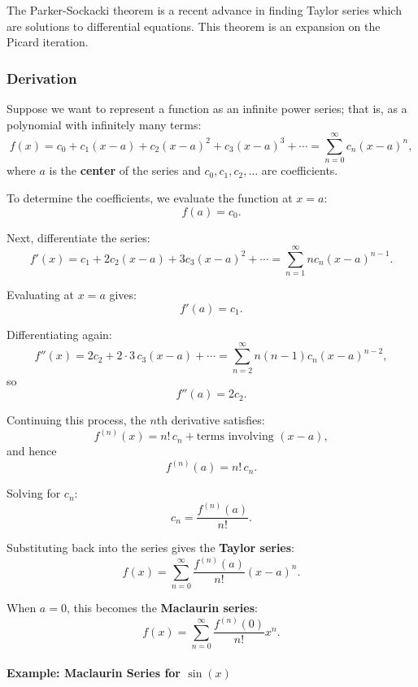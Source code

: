 The Parker-Sockacki theorem is a recent advance in finding Taylor series which are solutions to differential equations. This theorem is an expansion on the Picard iteration.


\subsubsection{Derivation}
\label{sss:deri-b600}

Suppose we want to represent a function as an infinite power series; that is, 
as a polynomial with infinitely many terms:
\[
f(x) = c_0 + c_1(x-a) + c_2(x-a)^2 + c_3(x-a)^3 + \cdots
= \sum_{n=0}^{\infty} c_n (x-a)^n,
\]
where $a$ is the \textbf{center} of the series and $c_0, c_1, c_2, \dots$ are coefficients.

\medskip

To determine the coefficients, we evaluate the function at $x=a$:
\[
f(a) = c_0.
\]

Next, differentiate the series:
\[
f'(x) = c_1 + 2c_2(x-a) + 3c_3(x-a)^2 + \cdots
= \sum_{n=1}^{\infty} n c_n (x-a)^{n-1}.
\]

Evaluating at $x=a$ gives:
\[
f'(a) = c_1.
\]

Differentiating again:
\[
f''(x) = 2c_2 + 2\cdot 3\, c_3 (x-a) + \cdots
= \sum_{n=2}^{\infty} n(n-1)c_n (x-a)^{n-2},
\]
so
\[
f''(a) = 2c_2.
\]

Continuing this process, the $n$th derivative satisfies:
\[
f^{(n)}(x) = n! \, c_n + \text{terms involving } (x-a),
\]
and hence
\[
f^{(n)}(a) = n! \, c_n.
\]

Solving for $c_n$:
\[
c_n = \frac{f^{(n)}(a)}{n!}.
\]

\medskip

Substituting back into the series gives the \textbf{Taylor series}:
\[
f(x) = \sum_{n=0}^{\infty} \frac{f^{(n)}(a)}{n!}(x-a)^n.
\]

When $a=0$, this becomes the \textbf{Maclaurin series}:
\[
f(x) = \sum_{n=0}^{\infty} \frac{f^{(n)}(0)}{n!} x^n.
\]

\paragraph{Example: Maclaurin Series for $\sin(x)$}

